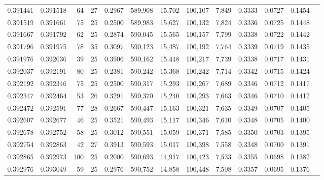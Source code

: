 \begin{tabular}{rrrrrrrrrrrrr}
0.391441 & 0.391518 &    64 &  27 &                                     0.2967 & 589,908 &  15,702 & 100,107 &   7,849 & 0.3333 & 0.0727 & 0.1454 \\
0.391519 & 0.391661 &    75 &  25 &                                     0.2500 & 589,983 &  15,627 & 100,132 &   7,824 & 0.3336 & 0.0725 & 0.1448 \\
0.391667 & 0.391792 &    62 &  25 &                                     0.2874 & 590,045 &  15,565 & 100,157 &   7,799 & 0.3338 & 0.0722 & 0.1442 \\
0.391796 & 0.391975 &    78 &  35 &                                     0.3097 & 590,123 &  15,487 & 100,192 &   7,764 & 0.3339 & 0.0719 & 0.1435 \\
0.391976 & 0.392036 &    39 &  25 &                                     0.3906 & 590,162 &  15,448 & 100,217 &   7,739 & 0.3338 & 0.0717 & 0.1431 \\
0.392037 & 0.392191 &    80 &  25 &                                     0.2381 & 590,242 &  15,368 & 100,242 &   7,714 & 0.3342 & 0.0715 & 0.1424 \\
0.392192 & 0.392346 &    75 &  25 &                                     0.2500 & 590,317 &  15,293 & 100,267 &   7,689 & 0.3346 & 0.0712 & 0.1417 \\
0.392347 & 0.392464 &    53 &  26 &                                     0.3291 & 590,370 &  15,240 & 100,293 &   7,663 & 0.3346 & 0.0710 & 0.1412 \\
0.392472 & 0.392591 &    77 &  28 &                                     0.2667 & 590,447 &  15,163 & 100,321 &   7,635 & 0.3349 & 0.0707 & 0.1405 \\
0.392607 & 0.392677 &    46 &  25 &                                     0.3521 & 590,493 &  15,117 & 100,346 &   7,610 & 0.3348 & 0.0705 & 0.1400 \\
0.392678 & 0.392752 &    58 &  25 &                                     0.3012 & 590,551 &  15,059 & 100,371 &   7,585 & 0.3350 & 0.0703 & 0.1395 \\
0.392754 & 0.392863 &    42 &  27 &                                     0.3913 & 590,593 &  15,017 & 100,398 &   7,558 & 0.3348 & 0.0700 & 0.1391 \\
0.392865 & 0.392973 &   100 &  25 &                                     0.2000 & 590,693 &  14,917 & 100,423 &   7,533 & 0.3355 & 0.0698 & 0.1382 \\
0.392976 & 0.393049 &    59 &  25 &                                     0.2976 & 590,752 &  14,858 & 100,448 &   7,508 & 0.3357 & 0.0695 & 0.1376 \\

\end{tabular}
